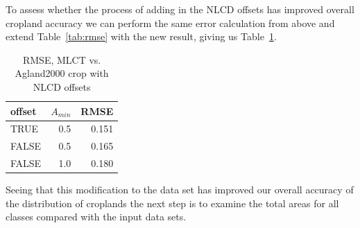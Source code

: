 To assess whether the process of adding in the NLCD offsets has
improved overall cropland accuracy we can perform the same error
calculation from above and extend Table~\ref{tab:rmse} with the new
result, giving us Table~\ref{tab:rmse2}.

\begin{table}[ht]
\begin{center}
\begin{tabular}{lrr}
  \hline
offset & $A_{min}$ & RMSE \\ 
  \hline
TRUE & 0.5 & 0.151 \\ 
  FALSE & 0.5 & 0.165 \\ 
  FALSE & 1.0 & 0.180 \\ 
   \hline
\end{tabular}
\caption{RMSE, MLCT vs. Agland2000 crop with NLCD offsets}
\label{tab:rmse2}
\end{center}
\end{table}


Seeing that this modification to the data set has improved our overall
accuracy of the distribution of croplands the next step is to examine
the total areas for all classes compared with the input data sets.  



